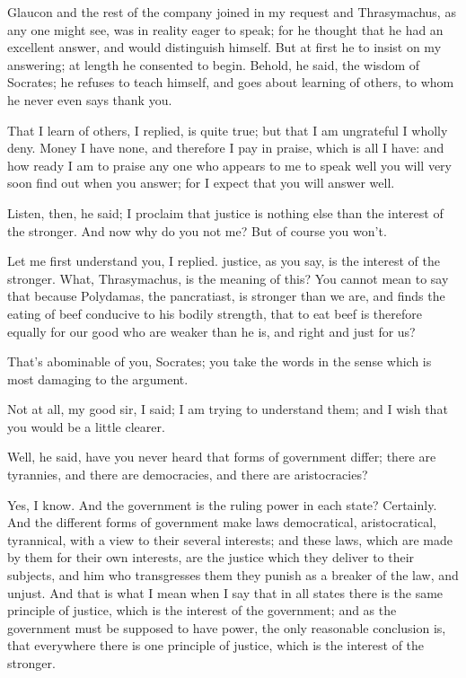 Glaucon and the rest of the company joined in my request and Thrasymachus, as any one might see, was in reality eager to speak; for he thought that he had an excellent answer, and would distinguish himself. But at first he to insist on my answering; at length he consented to begin. Behold, he said, the wisdom of Socrates; he refuses to teach himself, and goes about learning of others, to whom he never even says thank you.

That I learn of others, I replied, is quite true; but that I am ungrateful I wholly deny. Money I have none, and therefore I pay in praise, which is all I have: and how ready I am to praise any one who appears to me to speak well you will very soon find out when you answer; for I expect that you will answer well.

Listen, then, he said; I proclaim that justice is nothing else than the interest of the stronger. And now why do you not me? But of course you won't.

Let me first understand you, I replied. justice, as you say, is the interest of the stronger. What, Thrasymachus, is the meaning of this? You cannot mean to say that because Polydamas, the pancratiast, is stronger than we are, and finds the eating of beef conducive to his bodily strength, that to eat beef is therefore equally for our good who are weaker than he is, and right and just for us?

That's abominable of you, Socrates; you take the words in the sense which is most damaging to the argument.

Not at all, my good sir, I said; I am trying to understand them; and I wish that you would be a little clearer.

Well, he said, have you never heard that forms of government differ; there are tyrannies, and there are democracies, and there are aristocracies?

Yes, I know.
And the government is the ruling power in each state?
Certainly.
And the different forms of government make laws democratical, aristocratical, tyrannical, with a view to their several interests; and these laws, which are made by them for their own interests, are the justice which they deliver to their subjects, and him who transgresses them they punish as a breaker of the law, and unjust. And that is what I mean when I say that in all states there is the same principle of justice, which is the interest of the government; and as the government must be supposed to have power, the only reasonable conclusion is, that everywhere there is one principle of justice, which is the interest of the stronger.

